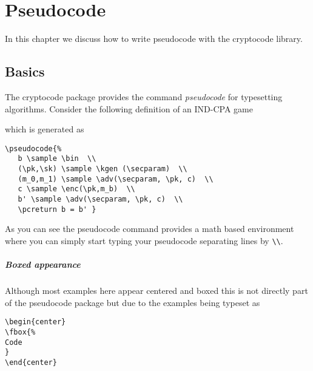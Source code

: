 \documentclass[a4paper]{report}
\begin{document}
\chapter{Pseudocode}
\label{chap:pseudocode}

In this chapter we discuss how to write pseudocode with the cryptocode library.

\section{Basics}

The cryptocode package provides the command \emph{pseudocode} for typesetting algorithms.
Consider the following definition of an IND-CPA game
\begin{center}
\end{center}
which is generated as
\begin{lstlisting}
\pseudocode{%
   b \sample \bin  \\
   (\pk,\sk) \sample \kgen (\secparam)  \\
   (m_0,m_1) \sample \adv(\secparam, \pk, c)  \\
   c \sample \enc(\pk,m_b)  \\
   b' \sample \adv(\secparam, \pk, c)  \\
   \pcreturn b = b' }
\end{lstlisting}
As you can see the pseudocode command provides a math based environment where you can simply start typing your pseudocode
separating lines by \lstinline$\\$.


\paragraph{Boxed appearance}
Although most examples here appear centered and boxed this is not directly part of the pseudocode package but due to the examples being
typeset as
\begin{lstlisting}
\begin{center}
\fbox{%
Code
}
\end{center}
\end{lstlisting}
\end{document}
